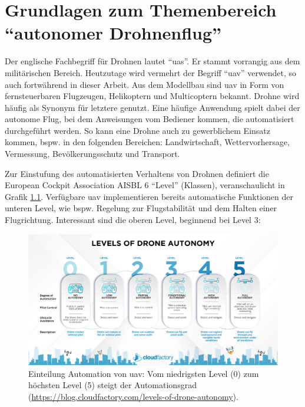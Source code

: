 
\chapter{Grundlagen zum Themenbereich \enquote{autonomer Drohnenflug}}

Der englische Fachbegriff für Drohnen lautet \enquote{\gls{uas}}. Er stammt vorrangig aus dem militärischen Bereich. Heutzutage wird vermehrt der Begriff \enquote{\gls{uav}} verwendet, so auch fortwährend in dieser Arbeit. Aus dem Modellbau sind \gls{uav} in Form von fernsteuerbaren Flugzeugen, Helikoptern und Multicoptern bekannt. Drohne wird häufig als Synonym für letztere genutzt. Eine häufige Anwendung spielt dabei der autonome Flug, bei dem Anweisungen vom Bediener kommen, die automatisiert durchgeführt werden. So kann eine Drohne auch zu gewerblichem Einsatz kommen, bspw. in den folgenden Bereichen: Landwirtschaft, Wettervorhersage, Vermessung, Bevölkerungsschutz und Transport.

Zur Einstufung des automatisierten Verhaltens von Drohnen definiert die European Cockpit Association AISBL 6 \enquote{Level} (Klassen), veranschaulicht in Grafik \ref{fig:automation_levels}.
Verfügbare \gls{uav} implementieren bereits automatische Funktionen der unteren Level, wie bspw. Regelung zur Flugstabilität und dem Halten einer Flugrichtung. Interessant sind die oberen Level, beginnend bei Level 3:

\begin{figure}[!h]
	\includegraphics[width=\linewidth]{images/drone_autonomy_levels.png}
	\caption{Einteilung Automation von \gls{uav}: Vom niedrigsten Level (0) zum höchsten Level (5) steigt der Automationsgrad (\url{https://blog.cloudfactory.com/levels-of-drone-autonomy}).}
	\label{fig:automation_levels}
	\end{figure}

